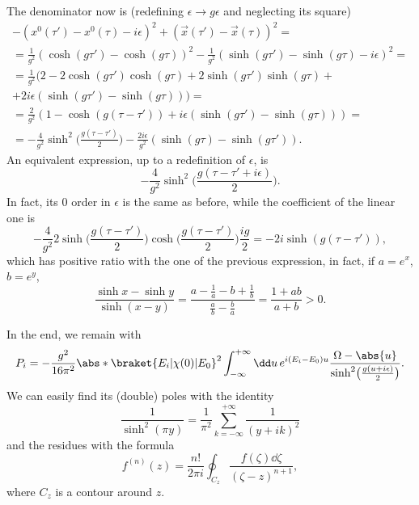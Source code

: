 \documentclass[a4paper,12pt]{book}
\begin{document}
The denominator now is (redefining $\epsilon\to g\epsilon$ and neglecting its square)
\begin{multline*}
-(x^0(\tau')-x^0(\tau)-i\epsilon)^2+(\vec x(\tau')-\vec x(\tau))^2=\\
=\frac1{g^2}(\cosh(g\tau')-\cosh(g\tau))^2-\frac1{g^2}(\sinh(g\tau')-\sinh(g\tau)-i\epsilon)^2=\\
=\frac1{g^2}(2-2\cosh(g\tau')\cosh(g\tau)+2\sinh(g\tau')\sinh(g\tau)+\\
+2i\epsilon(\sinh(g\tau')-\sinh(g\tau)))=\\
=\frac2{g^2}(1-\cosh(g(\tau-\tau'))+i\epsilon(\sinh(g\tau')-\sinh(g\tau)))=\\
=-\frac4{g^2}\sinh^2\biggl(\frac{g(\tau-\tau')}{2}\biggr)-\frac{2i\epsilon}{g^2}(\sinh(g\tau)-\sinh(g\tau')).
\end{multline*}
An equivalent expression, up to a redefinition of $\epsilon$, is
\[-\frac4{g^2}\sinh^2\biggl(\frac{g(\tau-\tau'+i\epsilon)}2\biggr).\]
In fact, its 0 order in $\epsilon$ is the same as before, while the coefficient of the linear one is
\[-\frac4{g^2}2\sinh\biggl(\frac{g(\tau-\tau')}2\biggr)\cosh\biggl(\frac{g(\tau-\tau')}2\biggr)\frac{ig}2=-2i\sinh(g(\tau-\tau')),\]
which has positive ratio with the one of the previous expression, in fact, if $a=e^x$, $b=e^y$,
\[\frac{\sinh x-\sinh y}{\sinh(x-y)}=\frac{a-\frac1a-b+\frac1b}{\frac ab-\frac ba}=\frac{1+ab}{a+b}>0.\]

In the end, we remain with
\[P_i=-\frac{g^2}{16\pi^2}\abs*{\braket{E_i|\chi(0)|E_0}}^2\int_{-\infty}^{+\infty}\dd u\,e^{i(E_i-E_0)u}\frac{\Omega-\abs{u}}{\sinh^2\bigl(\frac{g(u+i\epsilon)}2\bigr)}.\]
We can easily find its (double) poles with the identity
\[\frac1{\sinh^2(\pi y)}=\frac1{\pi^2}\sum_{k=-\infty}^{+\infty}\frac1{(y+ik)^2}\]
and the residues with the formula
\[f^{(n)}(z)=\frac{n!}{2\pi i}\oint_{C_z}\frac{f(\zeta)\dd\zeta}{(\zeta-z)^{n+1}},\]
where $C_z$ is a contour around $z$.
\end{document}
